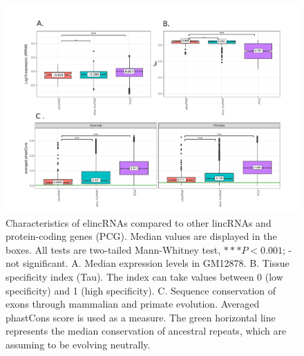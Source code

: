 \documentclass[11pt,a4paper]{report}
\begin{document}
\begin{figure}[ht]
	\includegraphics[width=1\textwidth]{Figures/1_full_characterization_elincRNA.pdf}
	\caption{Characteristics of elincRNAs compared to other lincRNAs and protein-coding genes (PCG). Median values are displayed in the boxes. All tests are two-tailed Mann-Whitney test, $***P<0.001$; - not significant. A. Median expression levels in GM12878. B. Tissue specificity index (Tau). The index can take values between 0 (low specificity) and 1 (high specificity). C. Sequence conservation of exons through mammalian and primate evolution. Averaged phastCons score is used as a measure. The green horizontal line represents the median conservation of ancestral repeats, which are assuming to be evolving neutrally. }
	\label{charac_elinc}
\end{figure}
\end{document}
